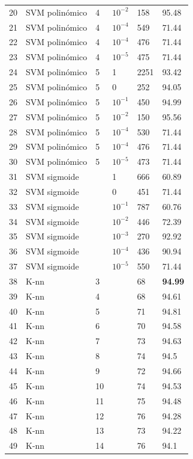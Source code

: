 \documentclass[journal]{IEEEtran}
\begin{document}
\begin{table}[!hb]
\begin{tabular}{l | l l l | l l}
	20	&	SVM polinómico 	&	4	&	 $ 10^{-2} $  	&	158	&	95.48 \\
	21	&	SVM polinómico 	&	4	&	$ 10^{-4} $	&	549	&	71.44 \\
	22	&	SVM polinómico 	&	4	&	 $ 10^{-4} $  	&	476	&	71.44 \\
	23	&	SVM polinómico 	&	4	&	 $ 10^{-5} $  	&	475	&	71.44 \\
	24	&	SVM polinómico 	&	5	&	1	&	2251	&	93.42 \\
	25	&	SVM polinómico 	&	5	&	0	&	252	&	94.05 \\
	26	&	SVM polinómico 	&	5	&	 $ 10^{-1} $  	&	450	&	94.99 \\
	27	&	SVM polinómico 	&	5	&	 $ 10^{-2} $  	&	150	&	95.56 \\
	28	&	SVM polinómico 	&	5	&	$ 10^{-4} $	&	530	&	71.44 \\
	29	&	SVM polinómico 	&	5	&	 $ 10^{-4} $  	&	476	&	71.44 \\
	30	&	SVM polinómico 	&	5	&	 $ 10^{-5} $  	&	473	&	71.44 \\
	31	&	SVM sigmoide 	&		&	1	&	666	&	60.89 \\
	32	&	SVM sigmoide 	&		&	0	&	451	&	71.44 \\
	33	&	SVM sigmoide 	&		&	 $ 10^{-1} $ 	&	787	&	60.76 \\
	34	&	SVM sigmoide 	&		&	 $ 10^{-2} $ 	&	446	&	72.39 \\
	35	&	SVM sigmoide 	&		&	$ 10^{-3} $	&	270	&	92.92 \\
	36	&	SVM sigmoide 	&		&	 $ 10^{-4} $ 	&	436	&	90.94 \\
	37	&	SVM sigmoide 	&		&	 $ 10^{-5} $ 	&	550	&	71.44 \\
\hline
	38	&	K-nn	&	3	&		&	68	&	\textbf{94.99} \\
	39	&	K-nn	&	4	&		&	68	&	94.61 \\
	40	&	K-nn	&	5	&		&	71	&	94.81 \\
	41	&	K-nn	&	6	&		&	70	&	94.58 \\
	42	&	K-nn	&	7	&		&	73	&	94.63 \\
	43	&	K-nn	&	8	&		&	74	&	94.5 \\
	44	&	K-nn	&	9	&		&	72	&	94.66 \\
	45	&	K-nn	&	10	&		&	74	&	94.53 \\
	46	&	K-nn	&	11	&		&	75	&	94.48 \\
	47	&	K-nn	&	12	&		&	76	&	94.28 \\
	48	&	K-nn	&	13	&		&	73	&	94.22 \\
	49	&	K-nn	&	14	&		&	76	&	94.1 \\

\end{tabular}
\end{table}
\end{document}
